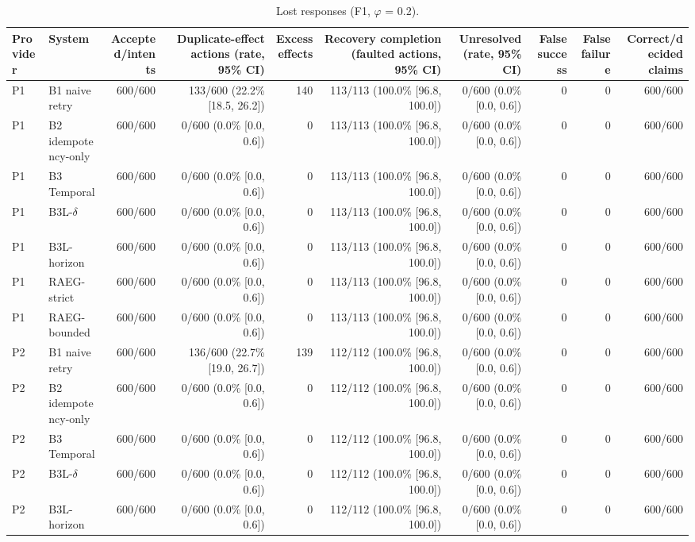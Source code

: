 \begin{table}[t]
\centering
\scriptsize
\caption{Lost responses (F1, $\varphi$ = 0.2).}
\label{tab:m7-f1}
\begin{tabular}{llrrrrrrrr}
\toprule
Provider & System & Accepted/intents & Duplicate-effect actions (rate, 95\% CI) & Excess effects & Recovery completion (faulted actions, 95\% CI) & Unresolved (rate, 95\% CI) & False success & False failure & Correct/decided claims \\
\midrule
P1 & B1 naive retry & 600/600 & 133/600 (22.2\% [18.5, 26.2]) & 140 & 113/113 (100.0\% [96.8, 100.0]) & 0/600 (0.0\% [0.0, 0.6]) & 0 & 0 & 600/600 \\
P1 & B2 idempotency-only & 600/600 & 0/600 (0.0\% [0.0, 0.6]) & 0 & 113/113 (100.0\% [96.8, 100.0]) & 0/600 (0.0\% [0.0, 0.6]) & 0 & 0 & 600/600 \\
P1 & B3 Temporal & 600/600 & 0/600 (0.0\% [0.0, 0.6]) & 0 & 113/113 (100.0\% [96.8, 100.0]) & 0/600 (0.0\% [0.0, 0.6]) & 0 & 0 & 600/600 \\
P1 & B3L-$\delta$ & 600/600 & 0/600 (0.0\% [0.0, 0.6]) & 0 & 113/113 (100.0\% [96.8, 100.0]) & 0/600 (0.0\% [0.0, 0.6]) & 0 & 0 & 600/600 \\
P1 & B3L-horizon & 600/600 & 0/600 (0.0\% [0.0, 0.6]) & 0 & 113/113 (100.0\% [96.8, 100.0]) & 0/600 (0.0\% [0.0, 0.6]) & 0 & 0 & 600/600 \\
P1 & RAEG-strict & 600/600 & 0/600 (0.0\% [0.0, 0.6]) & 0 & 113/113 (100.0\% [96.8, 100.0]) & 0/600 (0.0\% [0.0, 0.6]) & 0 & 0 & 600/600 \\
P1 & RAEG-bounded & 600/600 & 0/600 (0.0\% [0.0, 0.6]) & 0 & 113/113 (100.0\% [96.8, 100.0]) & 0/600 (0.0\% [0.0, 0.6]) & 0 & 0 & 600/600 \\
P2 & B1 naive retry & 600/600 & 136/600 (22.7\% [19.0, 26.7]) & 139 & 112/112 (100.0\% [96.8, 100.0]) & 0/600 (0.0\% [0.0, 0.6]) & 0 & 0 & 600/600 \\
P2 & B2 idempotency-only & 600/600 & 0/600 (0.0\% [0.0, 0.6]) & 0 & 112/112 (100.0\% [96.8, 100.0]) & 0/600 (0.0\% [0.0, 0.6]) & 0 & 0 & 600/600 \\
P2 & B3 Temporal & 600/600 & 0/600 (0.0\% [0.0, 0.6]) & 0 & 112/112 (100.0\% [96.8, 100.0]) & 0/600 (0.0\% [0.0, 0.6]) & 0 & 0 & 600/600 \\
P2 & B3L-$\delta$ & 600/600 & 0/600 (0.0\% [0.0, 0.6]) & 0 & 112/112 (100.0\% [96.8, 100.0]) & 0/600 (0.0\% [0.0, 0.6]) & 0 & 0 & 600/600 \\
P2 & B3L-horizon & 600/600 & 0/600 (0.0\% [0.0, 0.6]) & 0 & 112/112 (100.0\% [96.8, 100.0]) & 0/600 (0.0\% [0.0, 0.6]) & 0 & 0 & 600/600 \\

\end{tabular}
\end{table}

